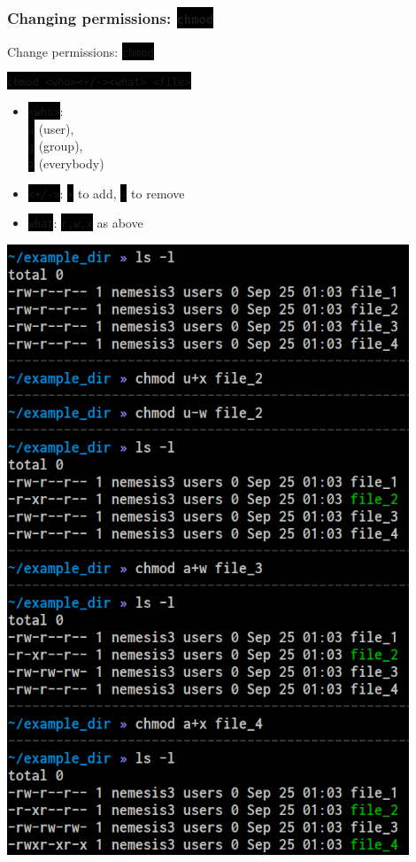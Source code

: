 \documentclass[unknownkeysallowed, 10pt, a4 paper, handout]{beamer}
\newcommand{\code}[1]{\colorbox{black}{\color{green}\texttt{#1}}}
\newcommand{\sidebyside}[5]{
  \begin{minipage}{#1\textwidth}
    #2
  \end{minipage} #3 \begin{minipage}{#4\textwidth}
    #5
  \end{minipage}
}
\begin{document}
\begin{frame}
  \begin{center}
    \frametitle{Changing permissions: \code{chmod}}

    \sidebyside{0.42}{
      Change permissions: \code{chmod}

      \code{chmod <who><+/-><what> <file>}

      \begin{itemize}
        \item \code{<who>}:\\
          \code{u} (user),\\
          \code{g} (group),\\
          \code{a} (everybody)
        \item \code{<+/->}: \code{+} to add, \code{-} to remove
        \item \code{what}: \code{r,w,x} as above
      \end{itemize}
    }{\hfill}{0.48}{
      \begin{center}
        \includegraphics[width=0.90\textwidth]{pics/chmod.png}
      \end{center}
    }
  \end{center}
\end{frame}
\end{document}

